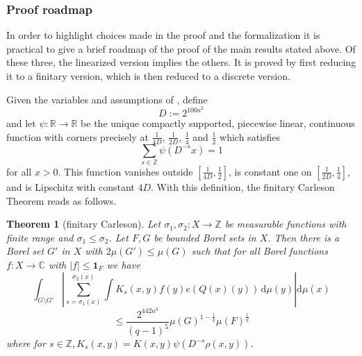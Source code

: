 \documentclass[12pt]{amsart}
\newcommand*{\real}{\mathbb{R}} %
\theoremstyle{definition}
\theoremstyle{plain}
\newtheorem{theorem}{Theorem}[subsection]
\newcommand{\Z}{{\mathbb{Z}}}
\def\C{\mathbb{C}}
\newcommand{\tQ}{{Q}}
\begin{document}
\subsubsection{Proof roadmap}\label{subsubsec:proof-sketch}

In order to highlight choices made in the proof and the formalization it is practical to give a brief roadmap
of the proof of the main results stated above.
Of these three, the linearized version  implies the others. It is proved by first reducing it to a finitary version, which is then reduced to a discrete version.

Given the variables and assumptions of , define
\[
D := 2^{100a^2}
\]
and let
 $\psi\colon \real\to \real$ be the unique compactly supported, piecewise linear, continuous function with corners precisely at $\frac 1{4D}$, $\frac 1{2D}$, $\frac 14$ and $\frac 12$ which satisfies
 \begin{equation}
    \label{eq-psisum}
    \sum_{s\in \mathbb{Z}} \psi(D^{-s}x)=1
\end{equation}
for all $x>0$. This function vanishes outside $[\frac1{4D},\frac 12]$, is constant one on
$[\frac1{2D},\frac 14]$, and is Lipschitz with constant $4D$. With this definition, the finitary Carleson Theorem reads as follows.

\begin{theorem}[finitary Carleson]
\label{finitary-Carleson}
Let ${\sigma_1},\sigma_2\colon X\to \mathbb{Z}$ be measurable functions with finite range and ${\sigma_1}\leq \sigma_2$. Let $F,G$ be bounded Borel sets in $X$. Then there is a Borel set $G'$ in $X$ with $2\mu(G')\leq \mu(G)$ such that
for all Borel functions $f\colon X\to \C$ with $|f|\le \mathbf{1}_F$ we have
\begin{equation*}
    \int_{G \setminus G'} \left|\sum_{s={\sigma_1}(x)}^{{\sigma_2}(x)} \int K_s(x,y) f(y) e(\tQ(x)(y)) \, \mathrm{d}\mu(y) \right| \mathrm{d}\mu(x)
\end{equation*}
\begin{equation}
    \label{eq-linearized}
    \le \frac{2^{442a^3}}{(q-1)^5} \mu(G)^{1-\frac{1}{q}} \mu(F)^{\frac 1 q}
\end{equation}
where for $s \in \Z, K_s(x,y) = K(x,y)\psi(D^{-s}\rho(x,y))$.
\end{theorem}
\end{document}

